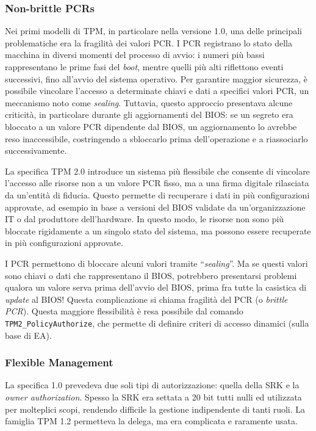 \subsubsection{Non-brittle PCRs}
Nei primi modelli di TPM, in particolare nella versione 1.0, una delle principali problematiche era la fragilità dei valori PCR. I PCR registrano lo stato della macchina in diversi momenti del processo di avvio: i numeri più bassi rappresentano le prime fasi del \textit{boot}, mentre quelli più alti riflettono eventi successivi, fino all'avvio del sistema operativo. Per garantire maggior sicurezza, è possibile vincolare l'accesso a determinate chiavi e dati a specifici valori PCR, un meccanismo noto come \textit{sealing}. Tuttavia, questo approccio presentava alcune criticità, in particolare durante gli aggiornamenti del BIOS: se un segreto era bloccato a un valore PCR dipendente dal BIOS, un aggiornamento lo avrebbe reso inaccessibile, costringendo a sbloccarlo prima dell'operazione e a riassociarlo successivamente.

La specifica TPM 2.0 introduce un sistema più flessibile che consente di vincolare l’accesso alle risorse non a un valore PCR fisso, ma a una firma digitale rilasciata da un’entità di fiducia. Questo permette di recuperare i dati in più configurazioni approvate, ad esempio in base a versioni del BIOS validate da un'organizzazione IT o dal produttore dell’hardware. In questo modo, le risorse non sono più bloccate rigidamente a un singolo stato del sistema, ma possono essere recuperate in più configurazioni approvate.

I PCR permettono di bloccare alcuni valori tramite “\textit{sealing}”. Ma se questi valori sono chiavi o dati che rappresentano il BIOS, potrebbero presentarsi problemi qualora un valore serva prima dell’avvio del BIOS, prima fra tutte la casistica di \textit{update} al BIOS! Questa complicazione si chiama fragilità del PCR (o \textit{brittle PCR}). Questa maggiore flessibilità è resa possibile dal comando \texttt{TPM2\_PolicyAuthorize}, che permette di definire criteri di accesso dinamici (sulla base di EA). 

\subsubsection{Flexible Management}
La specifica 1.0 prevedeva due soli tipi di autorizzazione: quella della SRK e la \textit{owner authorization}. Spesso la SRK era settata a 20 bit tutti nulli ed utilizzata per molteplici scopi, rendendo difficile la gestione indipendente di tanti ruoli. La famiglia TPM 1.2 permetteva la delega, ma era complicata e raramente usata.

